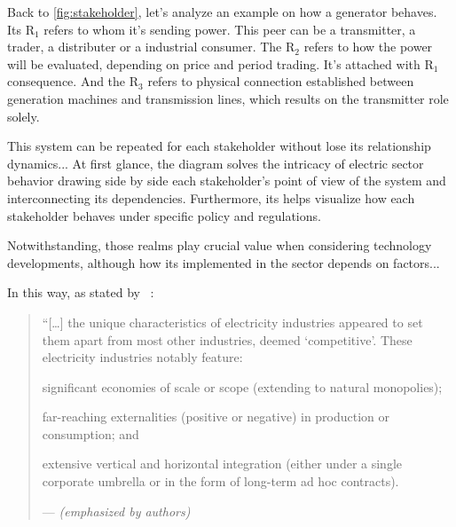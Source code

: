 Back to \autoref{fig:stakeholder}, let's analyze an example on how a generator behaves.
Its R$_{1}$ refers to whom it's sending power. This peer can be a transmitter, a trader, a distributer or a industrial consumer.
The R$_{2}$ refers to how the power will be evaluated, depending on price and period trading. It's attached with R$_{1}$ consequence.
And the R$_{3}$ refers to physical connection established between generation machines and transmission lines, which results on the transmitter role solely.


This system can be repeated for each stakeholder without lose its relationship dynamics...
At first glance, the diagram solves the intricacy of electric sector behavior drawing side by side each stakeholder's point of view of the system and interconnecting its dependencies. %
Furthermore, its helps visualize %
how each stakeholder behaves under specific policy and regulations. %

Notwithstanding, those realms play crucial value when considering technology developments, although how its implemented in the sector depends on factors...

In this way, as stated by \citeauthor{book:networks}~\cite{book:networks}:
\begin{quotation}
``[\dots] the unique characteristics of electricity industries appeared to set them apart from most other industries, deemed `competitive'.
These electricity industries notably feature:
\begin{itemize*}[font={\it}]
  \item [significant economies] of scale or scope (extending to natural monopolies);
  \item [far-reaching externalities] (positive or negative) in production or consumption;
  and \item [extensive vertical and horizontal integration] (either under a single corporate umbrella or in the form of long-term ad hoc contracts).
\end{itemize*} --- {\it \small (emphasized by authors)}
\end{quotation}

